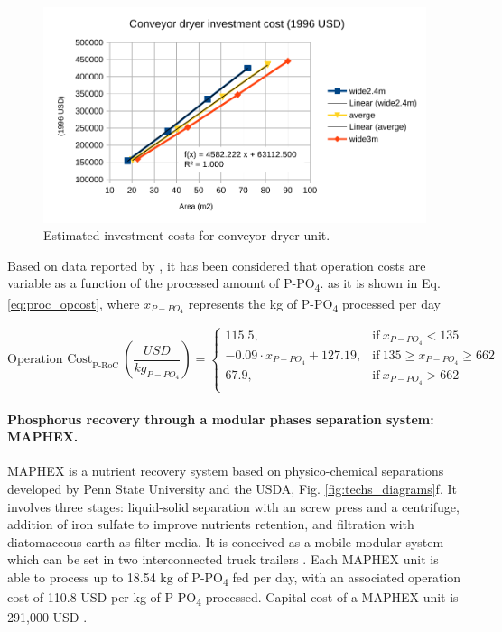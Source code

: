 \documentclass[10pt,a4paper]{article}
\begin{document}
\begin{figure}[H]
	\centering
	\includegraphics[width=0.8\linewidth]{converyor_dryer_investment_cost} 
	\caption{Estimated investment costs for conveyor dryer unit.}
	\label{fig:converyor_dryer_investment_cost}
\end{figure}

Based on data reported by , it has been considered that operation costs are variable as a function of the processed amount of P-PO\textsubscript{4}. as it is shown in Eq. \ref{eq:proc_opcost}, where $x_{P-PO_{4}}$ represents the kg of P-PO\textsubscript{4} processed per day

\begin{equation}
\text{Operation Cost}_{\text{P-RoC}} \ \left(\frac{USD}{kg_{P-PO_{4}}}\right)=
\begin{cases}
115.5, & \text{if}\ x_{P-PO_{4}} < 135 \\
-0.09 \cdot x_{P-PO_{4}} +127.19, & \text{if} \ 135 \geq x_{P-PO_{4}} \geq 662 \\
67.9, & \text{if} \ x_{P-PO_{4}} > 662 \\
\end{cases} \label{eq:proc_opcost}
\end{equation}

\paragraph{Phosphorus recovery through a modular phases separation system: MAPHEX.}
MAPHEX is a nutrient recovery system based on physico-chemical separations developed by Penn State University and the USDA, Fig. \ref{fig:techs_diagrams}f. It involves three stages: liquid-solid separation with an screw press and a centrifuge, addition of iron sulfate to improve nutrients retention, and filtration with diatomaceous earth as filter media. It is conceived as a mobile modular system which can be set in two interconnected truck trailers .
Each MAPHEX unit is able to process up to 18.54 kg of P-PO\textsubscript{4} fed per day, with an associated operation cost of 110.8 USD per kg of P-PO\textsubscript{4} processed. Capital cost of a MAPHEX unit is 291,000 USD .
\end{document}
